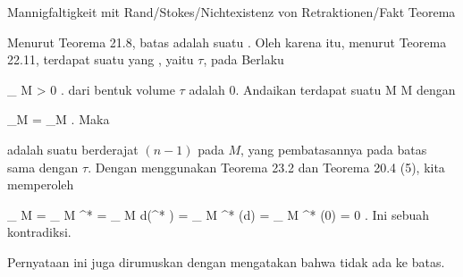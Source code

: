 {Mannigfaltigkeit mit Rand/Stokes/Nichtexistenz von Retraktionen/Fakt}
{Teorema}
{}
{

\faktzusatz {}
\faktzusatz {}

}
{

Menurut
Teorema 21.8,
batas
 adalah suatu
 {} {.}
Oleh karena itu, menurut
Teorema 22.11,
terdapat suatu
yang
,
yaitu $\tau$, pada
 Berlaku

\mavergleichskette
{\vergleichskette
{
\int_{  \partial M  }  \tau
}
{ > }{ 0
}
{  }{
}
{    }{
}
{   }{
}
}
{}{}{.}
dari bentuk volume $\tau$ adalah $0$.
Andaikan terdapat suatu
\maabbdisp {\varphi} { M } { \partial M
} {}
dengan

\mavergleichskette
{\vergleichskette
{ \varphi \vert_{\partial M}
}
{ = }{ _{\partial M}
}
{  }{
}
{    }{
}
{   }{
}
}
{}{}{.}
Maka

\mathl{\varphi^* \tau}{} adalah suatu
berderajat $(n-1)$ pada $M$, yang pembatasannya pada batas sama dengan $\tau$. Dengan menggunakan
Teorema 23.2
dan
Teorema 20.4 (5),
kita memperoleh

\mavergleichskettealign
{\vergleichskettealign
{
\int_{  \partial M  }   \tau
}
{ =} {
\int_{  \partial  M  }   \varphi^* \tau
}
{ =} {
\int_{  M  }   d(\varphi^* \tau)
}
{ =} {
\int_{  M  }   \varphi^* (d\tau)
}
{ =} {
\int_{  M  }   \varphi^* (0)
}
}
{
\vergleichskettefortsetzungalign
{ =} { 0
}
{ } {}
{ } {}
{ } {}
}
{}{.}
Ini sebuah kontradiksi.

}

Pernyataan ini juga dirumuskan dengan mengatakan bahwa tidak ada
 {} {}  {} ke batas.

